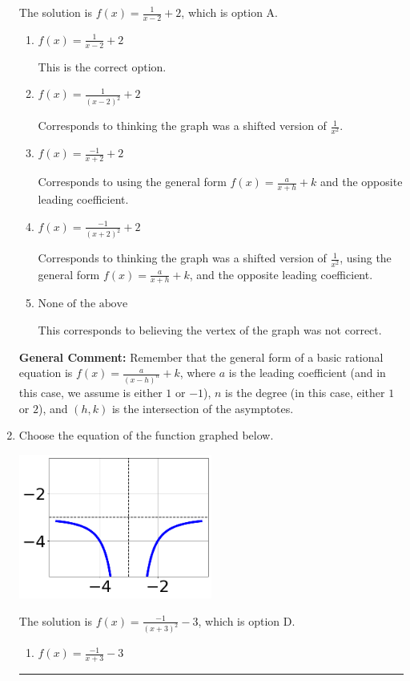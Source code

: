 \documentclass{extbook}[14pt]
\newcommand{\litem}[1]{\item #1

\rule{\textwidth}{0.4pt}}
\begin{document}
\begin{enumerate}
{The solution is \( f(x) = \frac{1}{x - 2} + 2 \), which is option A.\begin{enumerate}[label=\Alph*.]
\item \( f(x) = \frac{1}{x - 2} + 2 \)

This is the correct option.
\item \( f(x) = \frac{1}{(x - 2)^2} + 2 \)

Corresponds to thinking the graph was a shifted version of $\frac{1}{x^2}$.
\item \( f(x) = \frac{-1}{x + 2} + 2 \)

Corresponds to using the general form $f(x) = \frac{a}{x+h}+k$ and the opposite leading coefficient.
\item \( f(x) = \frac{-1}{(x + 2)^2} + 2 \)

Corresponds to thinking the graph was a shifted version of $\frac{1}{x^2}$, using the general form $f(x) = \frac{a}{x+h}+k$, and the opposite leading coefficient.
\item \( \text{None of the above} \)

This corresponds to believing the vertex of the graph was not correct.
\end{enumerate}

\textbf{General Comment:} Remember that the general form of a basic rational equation is $ f(x) = \frac{a}{(x-h)^n} + k$, where $a$ is the leading coefficient (and in this case, we assume is either $1$ or $-1$), $n$ is the degree (in this case, either $1$ or $2$), and $(h, k)$ is the intersection of the asymptotes.
}
\litem{
Choose the equation of the function graphed below.

\begin{center}
    \includegraphics[width=0.5\textwidth]{../Figures/rationalGraphToEquationCopyC.png}
\end{center}


The solution is \( f(x) = \frac{-1}{(x + 3)^2} - 3 \), which is option D.\begin{enumerate}[label=\Alph*.]
\item \( f(x) = \frac{-1}{x + 3} - 3 \)


\end{enumerate}}
\end{enumerate}
\end{document}
